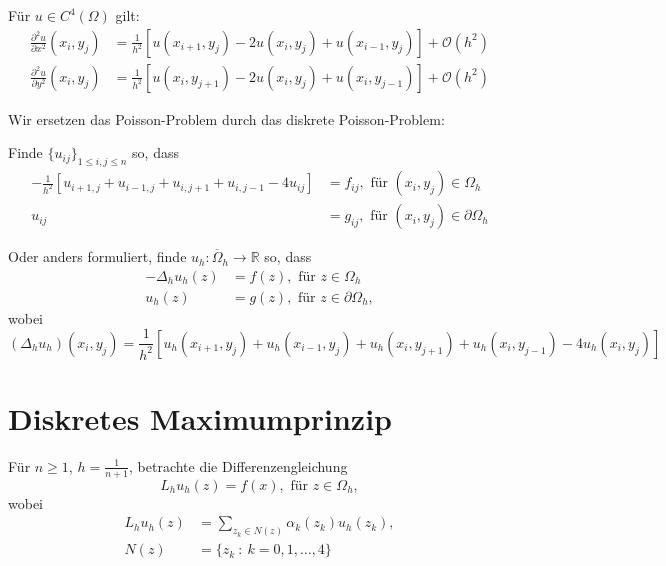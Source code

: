 Für $u \in C^4(\Omega)$ gilt:
\begin{align*}
\frac{\partial^2 u}{\partial x^2}(x_i, y_j)
    &= \frac{1}{h^2} \left[ u(x_{i+1}, y_j) - 2u(x_i, y_j) + u(x_{i-1}, y_j) \right] + \mathcal O(h^2) \\
\frac{\partial^2 u}{\partial y^2}(x_i, y_j)
    &= \frac{1}{h^2} \left[ u(x_i, y_{j+1}) - 2u(x_i, y_j) + u(x_i, y_{j-1}) \right] + \mathcal O(h^2)
\end{align*}

Wir ersetzen das Poisson-Problem durch das diskrete Poisson-Problem:

Finde $\{u_{ij}\}_{1 \leq i, j \leq n}$ so, dass
\begin{align*}
 - \frac{1}{h^2} \left[ u_{i+1, j} + u_{i-1, j} + u_{i, j+1} + u_{i, j-1} - 4 u_{ij} \right] &= f_{ij}, \text{ für }
    (x_i, y_j) \in \Omega_h \\
 u_{ij} &= g_{ij}, \text{ für } (x_i, y_j) \in \partial \Omega_h
\end{align*}

Oder anders formuliert, finde $u_h: \overline \Omega_h \to \mathbb R$ so, dass
\begin{align*}
- \Delta_h u_h(z) &= f(z), \text{ für } z \in \Omega_h \\
u_h(z) &= g(z), \text{ für } z \in \partial \Omega_h ,
\end{align*}
wobei 
\[
( \Delta_h u_h)(x_i, y_j)
    = \frac{1}{h^2}
    \left[
    u_h(x_{i+1}, y_j) + u_h(x_{i-1}, y_j) + u_h(x_i, y_{j+1}) + u_h(x_i, y_{j-1}) - 4 u_h(x_i, y_j) 
    \right]
\]

\section{Diskretes Maximumprinzip}
Für $n \geq 1$, $h = \frac{1}{n+1}$, betrachte die Differenzengleichung
\[
L_h u_h(z) = f(x), \text{ für } z \in \Omega_h ,
\]
wobei 
\begin{align*}
L_h u_h(z) &= \sum_{z_k \in N(z)} \alpha_k (z_k) u_h(z_k), \\
N(z) &= \{ z_k \ : \ k = 0, 1, \ldots, 4 \}
\end{align*}

